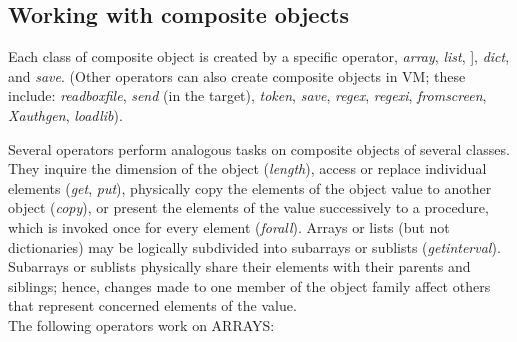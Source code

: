 \subsection{Working with composite objects}

Each class of composite object is created by a specific  operator, \emph{array},  \emph{list}, ], \emph{dict}, and \emph{save}. (Other operators can also create composite objects in VM; these include: \emph{readboxfile}, \emph{send} (in the target), \emph{token}, \emph{save}, \emph{regex}, \emph{regexi}, \emph{fromscreen}, \emph{Xauthgen}, \emph{loadlib}).

Several  operators  perform  analogous  tasks  on  composite  objects  of several classes. They inquire the dimension of the object (\emph{length}), access or replace individual elements (\emph{get}, \emph{put}), physically copy the elements of the object value to another object (\emph{copy}),  or present the elements of  the value successively to a procedure, which is invoked once for every element (\emph{forall}).  Arrays  or  lists  (but  not  dictionaries)  may  be  logically subdivided into subarrays or sublists (\emph{getinterval}). Subarrays or sublists physically  share their elements with their parents and  siblings;  hence, changes  made  to  one  member of the object  family  affect  others  that represent  concerned elements of the value.\\

\noindent The following operators work on ARRAYS:


